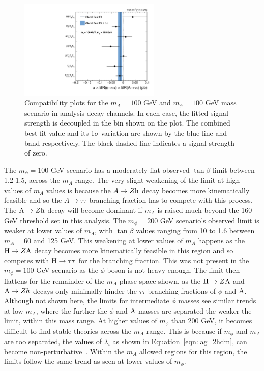 \begin{figure}[!hbtp]
\centering
    \includegraphics[width=0.6\textwidth]{Figures/ChannelCompatibilityCheck_FitResults_mphi100mA100_channel.pdf}
\caption[Plot of the compatibility of the model-independent results.]{Compatibility plots for the $m_{A}=100$ GeV and $m_{\phi}=100$ GeV mass scenario in analysis decay channels. In each case, the fitted signal strength is decoupled in the bin shown on the plot. The combined best-fit value and its 1$\sigma$ variation are shown by the blue line and band respectively. The black dashed line indicates a signal strength of zero.}
\label{fig:4tau_ccc}
\end{figure}

The $m_{\phi} = 100$ GeV scenario has a moderately flat observed $\tan\beta$ limit between 1.2-1.5, across the $m_{A}$ range.
The very slight weakening of the limit at high values of $m_{A}$ values is because the $A\rightarrow Z{\text{h}}$ decay becomes more kinematically feasible and so the $A\rightarrow\tau\tau$ branching fraction has to compete with this process.
The ${\text{A}}\rightarrow Z{\text{h}}$ decay will become dominant if $m_{A}$ is raised much beyond the 160 GeV threshold set in this analysis.
The $m_{\phi} = 200$ GeV scenario's observed limit is weaker at lower values of $m_{A}$, with $\tan\beta$ values ranging from 10 to 1.6 between $m_{A} = 60$ and 125 GeV.
This weakening at lower values of $m_{A}$ happens as the ${\text{H}}\rightarrow Z{\text{A}}$ decay becomes more kinematically feasible in this region and so competes with ${\text{H}}\rightarrow\tau\tau$ for the branching fraction.
This was not present in the $m_{\phi}=100$ GeV scenario as the $\phi$ boson is not heavy enough.
The limit then flattens for the remainder of the $m_{A}$ phase space shown, as the ${\text{H}}\rightarrow Z{\text{A}}$ and ${\text{A}}\rightarrow Zh$ decays only minimally hinder the $\tau\tau$ branching fractions of $\phi$ and ${\text{A}}$. \\

Although not shown here, the limits for intermediate $\phi$ masses see similar trends at low $m_{A}$, where the further the $\phi$ and ${\text{A}}$ masses are separated the weaker the limit, within this mass range.
At higher values of $m_\phi$ than 200 GeV, it becomes difficult to find stable theories across the $m_{A}$ range. 
This is because if $m_\phi$ and $m_{A}$ are too separated, the values of $\lambda_i$ as shown in Equation~\ref{eqn:lag_2hdm}, can become non-perturbative~\cite{Jueid:2021avn}.
Within the $m_{A}$ allowed regions for this region, the limits follow the same trend as seen at lower values of $m_{\phi}$. \\

